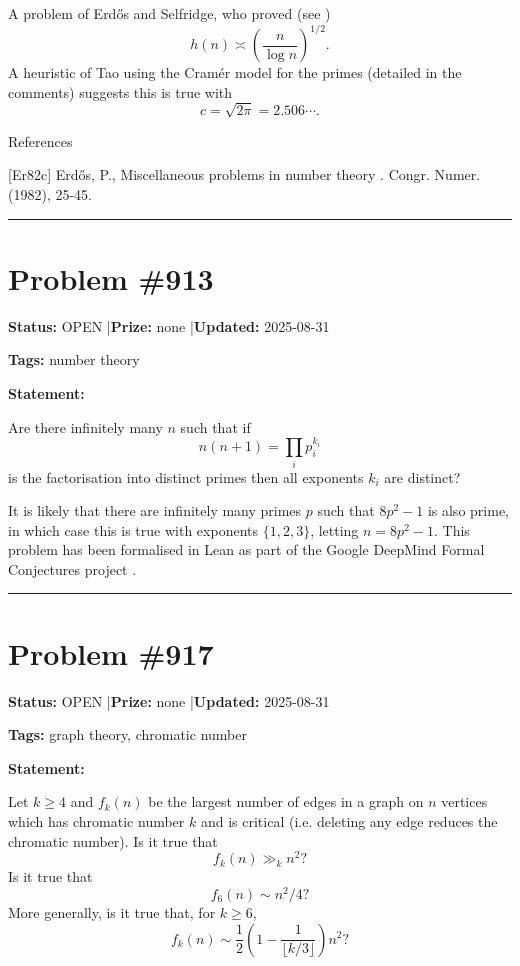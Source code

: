 \documentclass{article}
\begin{document}
A problem of Erd\H{o}s and Selfridge, who proved (see \cite{Er82c})\[h(n) \asymp \left(\frac{n}{\log n}\right)^{1/2}.\]A heuristic of Tao using the Cram\'{e}r model for the primes (detailed in the comments) suggests this is true with\[c=\sqrt{2\pi}=2.506\cdots.\]




References

[Er82c] Erd\H{o}s, P., Miscellaneous problems in number theory . Congr. Numer. (1982), 25-45.

\noindent\rule{\linewidth}{0.4pt}


\section{Problem \#913}
\label{prob:913}

\noindent\textbf{Status:} OPEN \quad|\quad \textbf{Prize:} none \quad|\quad \textbf{Updated:} 2025-08-31

\noindent\textbf{Tags:} number theory

\medskip

\noindent\textbf{Statement:}

Are there infinitely many $n$ such that if\[n(n+1) = \prod_i p_i^{k_i}\]is the factorisation into distinct primes then all exponents $k_i$ are distinct?




It is likely that there are infinitely many primes $p$ such that $8p^2-1$ is also prime, in which case this is true with exponents $\{1,2,3\}$, letting $n=8p^2-1$. This problem has been formalised in Lean as part of the Google DeepMind Formal Conjectures project .

\noindent\rule{\linewidth}{0.4pt}


\section{Problem \#917}
\label{prob:917}

\noindent\textbf{Status:} OPEN \quad|\quad \textbf{Prize:} none \quad|\quad \textbf{Updated:} 2025-08-31

\noindent\textbf{Tags:} graph theory, chromatic number

\medskip

\noindent\textbf{Statement:}

Let $k\geq 4$ and $f_k(n)$ be the largest number of edges in a graph on $n$ vertices which has chromatic number $k$ and is critical (i.e. deleting any edge reduces the chromatic number). Is it true that\[f_k(n) \gg_k n^2?\]Is it true that\[f_6(n)\sim n^2/4?\]More generally, is it true that, for $k\geq 6$,\[f_k(n) \sim \frac{1}{2}\left(1-\frac{1}{\lfloor k/3\rfloor}\right)n^2?\]
\end{document}
